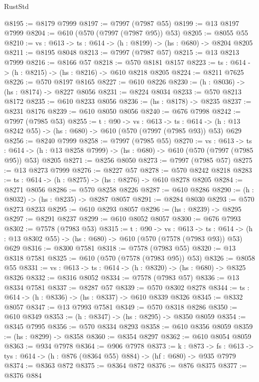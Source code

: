 \begin{lexlean}{RustStd}
\begin{coremodule}
@8195 := @8179 @7999
@8197 := @7997 (@7987 @55)
@8199 := @13 @8197 @7999
@8204 := @610 (@570 (@7997 (@7987 @95)) @53)
@8205 := @8055 @55
@8210 := {vs : @613} -> {ts : @614} -> (h : @8199) -> (hs : @680) -> @8204 @8205
@8211 := @8195 @8048
@8213 := @7997 (@7987 @57)
@8215 := @13 @8213 @7999
@8216 := @8166 @57
@8218 := @570 @8181 @8157
@8223 := {ts : @614} -> (h : @8215) -> (hs : @8216) -> @610 @8218 @8205
@8224 := @8211 @7625
@8226 := @570 @8197 @8165
@8227 := @610 @8226
@8230 := (h : @8036) -> (hs : @8174) -> @8227 @8056
@8231 := @8224 @8034
@8233 := @570 @8213 @8172
@8235 := @610 @8233 @8056
@8236 := (hs : @8178) -> @8235
@8237 := @8231 @8176
@8239 := @610 @8050 @8056
@8240 := @676 @7998
@8242 := @7997 (@7985 @53)
@8255 := {t : @90} ->
  {vs : @613} ->
  {ts : @614} -> (h : @13 @8242 @55) -> (hs : @680) -> @610 (@570 (@7997 (@7985 @93)) @53) @629
@8256 := @8240 @7999
@8258 := @7997 (@7985 @55)
@8270 := {vs : @613} ->
  {ts : @614} -> (h : @13 @8258 @7999) -> (hs : @680) -> @610 (@570 (@7997 (@7985 @95)) @53) @8205
@8271 := @8256 @8050
@8273 := @7997 (@7985 @57)
@8275 := @13 @8273 @7999
@8276 := @8227 @57
@8278 := @570 @8242 @8218
@8283 := {ts : @614} -> (h : @8275) -> (hs : @8276) -> @610 @8278 @8205
@8284 := @8271 @8056
@8286 := @570 @8258 @8226
@8287 := @610 @8286
@8290 := (h : @8032) -> (hs : @8235) -> @8287 @8057
@8291 := @8284 @8030
@8293 := @570 @8273 @8233
@8295 := @610 @8293 @8057
@8296 := (hs : @8239) -> @8295
@8297 := @8291 @8237
@8299 := @610 @8052 @8057
@8300 := @676 @7993
@8302 := @7578 (@7983 @53)
@8315 := {t : @90} ->
  {vs : @613} ->
  {ts : @614} -> (h : @13 @8302 @55) -> (hs : @680) -> @610 (@570 (@7578 (@7983 @93)) @53) @629
@8316 := @8300 @7581
@8318 := @7578 (@7983 @55)
@8320 := @13 @8318 @7581
@8325 := @610 (@570 (@7578 (@7983 @95)) @53)
@8326 := @8058 @55
@8331 := {vs : @613} -> {ts : @614} -> (h : @8320) -> (hs : @680) -> @8325 @8326
@8332 := @8316 @8052
@8334 := @7578 (@7983 @57)
@8336 := @13 @8334 @7581
@8337 := @8287 @57
@8339 := @570 @8302 @8278
@8344 := {ts : @614} -> (h : @8336) -> (hs : @8337) -> @610 @8339 @8326
@8345 := @8332 @8057
@8347 := @13 @7993 @7581
@8349 := @570 @8318 @8286
@8350 := @610 @8349
@8353 := (h : @8347) -> (hs : @8295) -> @8350 @8059
@8354 := @8345 @7995
@8356 := @570 @8334 @8293
@8358 := @610 @8356 @8059
@8359 := (hs : @8299) -> @8358
@8360 := @8354 @8297
@8362 := @610 @8054 @8059
@8363 := @934 @7978
@8364 := @906 @7978
@8373 := {k : @873} ->
  {fs : @613} -> {tys : @614} -> (h : @876 (@8364 @55) @884) -> (hf : @680) -> @935 @7979
@8374 := @8363 @872
@8375 := @8364 @872
@8376 := @876 @8375
@8377 := @8376 @884

\end{coremodule}
\end{lexlean}
